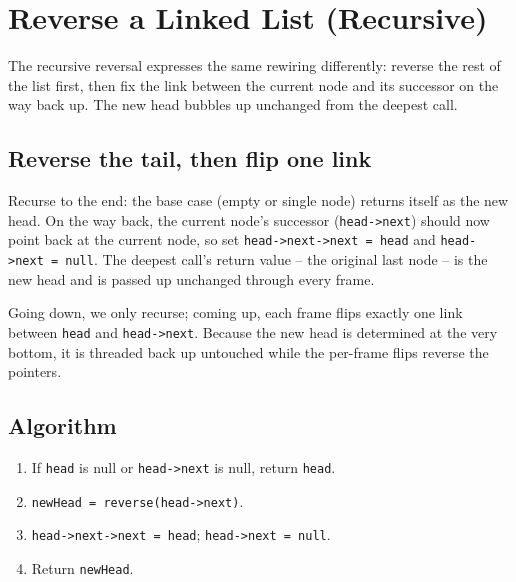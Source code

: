 \section{Reverse a Linked List (Recursive)}
\label{sec:ll-reverse-recursive}


\begin{patternbox}
The recursive reversal expresses the same rewiring differently: reverse the
rest of the list first, then fix the link between the current node and its
successor on the way back up. The new head bubbles up unchanged from the
deepest call.
\end{patternbox}

\subsection*{Reverse the tail, then flip one link}

Recurse to the end: the base case (empty or single node) returns itself as
the new head. On the way back, the current node's successor
(\texttt{head->next}) should now point back at the current node, so set
\texttt{head->next->next = head} and \texttt{head->next = null}. The deepest
call's return value -- the original last node -- is the new head and is
passed up unchanged through every frame.

\begin{ideabox}
Going down, we only recurse; coming up, each frame flips exactly one link
between \texttt{head} and \texttt{head->next}. Because the new head is
determined at the very bottom, it is threaded back up untouched while the
per-frame flips reverse the pointers.
\end{ideabox}

\subsection*{Algorithm}

\begin{enumerate}
  \item If \texttt{head} is null or \texttt{head->next} is null, return
        \texttt{head}.
  \item \texttt{newHead = reverse(head->next)}.
  \item \texttt{head->next->next = head}; \texttt{head->next = null}.
  \item Return \texttt{newHead}.
\end{enumerate}

